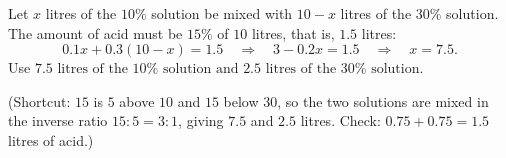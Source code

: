 Let $x$ litres of the $10\%$ solution be mixed with $10-x$ litres of the $30\%$ solution. The amount of acid must be $15\%$ of $10$ litres, that is, $1.5$ litres:
\[0.1x+0.3(10-x)=1.5\quad\Longrightarrow\quad3-0.2x=1.5\quad\Longrightarrow\quad x=7.5.\]
Use $\boxed{7.5\text{ litres of the }10\%\text{ solution and }2.5\text{ litres of the }30\%\text{ solution}}$.

(Shortcut: $15$ is $5$ above $10$ and $15$ below $30$, so the two solutions are mixed in the inverse ratio $15:5=3:1$, giving $7.5$ and $2.5$ litres. Check: $0.75+0.75=1.5$ litres of acid.)
